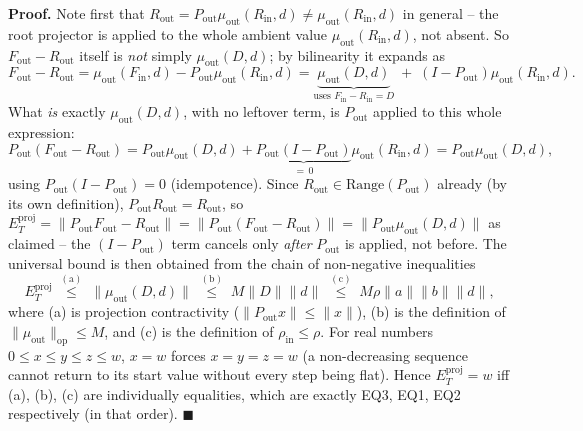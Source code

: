 \textbf{Proof.} Note first that $R_{\mathrm{out}}=P_{\mathrm{out}}\mu_{
\mathrm{out}}(R_{\mathrm{in}},d)\ne\mu_{\mathrm{out}}(R_{\mathrm{in}},d)$ in
general -- the root projector is applied to the whole ambient value
$\mu_{\mathrm{out}}(R_{\mathrm{in}},d)$, not absent. So $F_{\mathrm{out}}-
R_{\mathrm{out}}$ itself is \emph{not} simply $\mu_{\mathrm{out}}(D,d)$; by
bilinearity it expands as
\[
  F_{\mathrm{out}}-R_{\mathrm{out}}
  = \mu_{\mathrm{out}}(F_{\mathrm{in}},d)-P_{\mathrm{out}}\mu_{\mathrm{out}}(R_{\mathrm{in}},d)
  = \underbrace{\mu_{\mathrm{out}}(D,d)}_{\text{uses }F_{\mathrm{in}}-R_{\mathrm{in}}=D}
  \;+\; (I-P_{\mathrm{out}})\mu_{\mathrm{out}}(R_{\mathrm{in}},d).
\]
What \emph{is} exactly $\mu_{\mathrm{out}}(D,d)$, with no leftover term, is
$P_{\mathrm{out}}$ applied to this whole expression:
\[
  P_{\mathrm{out}}(F_{\mathrm{out}}-R_{\mathrm{out}})
  = P_{\mathrm{out}}\mu_{\mathrm{out}}(D,d)
  + \underbrace{P_{\mathrm{out}}(I-P_{\mathrm{out}})}_{=\,0}\mu_{\mathrm{out}}(R_{\mathrm{in}},d)
  = P_{\mathrm{out}}\mu_{\mathrm{out}}(D,d),
\]
using $P_{\mathrm{out}}(I-P_{\mathrm{out}})=0$ (idempotence). Since
$R_{\mathrm{out}}\in\mathrm{Range}(P_{\mathrm{out}})$ already (by its own
definition), $P_{\mathrm{out}}R_{\mathrm{out}}=R_{\mathrm{out}}$, so
$E_T^{\mathrm{proj}}=\|P_{\mathrm{out}}F_{\mathrm{out}}-R_{\mathrm{out}}\|=
\|P_{\mathrm{out}}(F_{\mathrm{out}}-R_{\mathrm{out}})\|=\|P_{\mathrm{out}}
\mu_{\mathrm{out}}(D,d)\|$ as claimed -- the $(I-P_{\mathrm{out}})$ term
cancels only \emph{after} $P_{\mathrm{out}}$ is applied, not before.
The universal bound is then obtained from the chain of non-negative
inequalities
\[
  E_T^{\mathrm{proj}}
  \;\overset{(\mathrm a)}{\le}\; \|\mu_{\mathrm{out}}(D,d)\|
  \;\overset{(\mathrm b)}{\le}\; M\|D\|\|d\|
  \;\overset{(\mathrm c)}{\le}\; M\rho\|a\|\|b\|\|d\|,
\]
where (a) is projection contractivity ($\|P_{\mathrm{out}}x\|\le\|x\|$),
(b) is the definition of $\|\mu_{\mathrm{out}}\|_{\mathrm{op}}\le M$, and
(c) is the definition of $\rho_{\mathrm{in}}\le\rho$. For real numbers
$0\le x\le y\le z\le w$, $x=w$ forces $x=y=z=w$ (a non-decreasing sequence
cannot return to its start value without every step being flat). Hence
$E_T^{\mathrm{proj}}=w$ iff (a), (b), (c) are individually equalities, which
are exactly EQ3, EQ1, EQ2 respectively (in that order). $\blacksquare$

